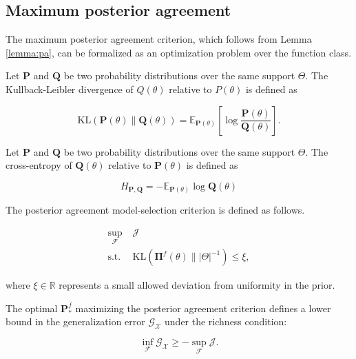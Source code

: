 \subsection{Maximum posterior agreement}

The maximum posterior agreement criterion, which follows 
from Lemma \ref{lemma:pa}, can be formalized as an optimization problem over the 
function class.

\begin{definition}
    Let $\mathbf{P}$ and $\mathbf{Q}$ be two probability distributions over the same support $\Theta$. 
    The Kullback-Leibler divergence of $Q(\theta)$ relative to $P(\theta)$ is defined as

    $$
    \text{KL}(\mathbf{P}(\theta) \parallel \mathbf{Q}(\theta)) = \mathbb{E}_{\mathbf{P}(\theta)} \left[ \log \frac{\mathbf{P}(\theta)}{\mathbf{Q}(\theta)} \right].
    $$

\end{definition} 

\begin{definition}
    Let $\mathbf{P}$ and $\mathbf{Q}$ be two probability distributions over the same support $\Theta$. 
    The cross-entropy of $\mathbf{Q}(\theta)$ relative to $\mathbf{P}(\theta)$ is defined as

    $$
    H_{\mathbf{P}, \mathbf{Q}} = - \mathbb{E}_{\mathbf{P}(\theta)} \log \mathbf{Q}(\theta)
    $$

\end{definition}

\begin{proposition}\label{def:pa}
    The posterior agreement model-selection criterion is defined as follows.

    $$
    \begin{aligned}
        \sup_{\mathcal{F}} & \; \mathcal{J} \\
        \text{s.t.} & \; \text{KL}(\mathbf{\Pi}^f(\theta) \parallel |\Theta|^{-1}) \leq \xi,
    \end{aligned}
    $$
    
    where $\xi \in \mathbb{R}$ represents a small allowed deviation from uniformity in the prior.
\end{proposition}

\begin{theorem}
The optimal $\mathbf{P}_{*}^f$ maximizing the posterior agreement criterion defines a lower bound
in the generalization error $\mathcal{G}_{\mathcal{X}}$ under the richness condition:

$$
    \inf_{\mathcal{F}} \mathcal{G}_{\mathcal{X}} \geq -\sup_{\mathcal{F}} \mathcal{J}.
$$
\end{theorem}

